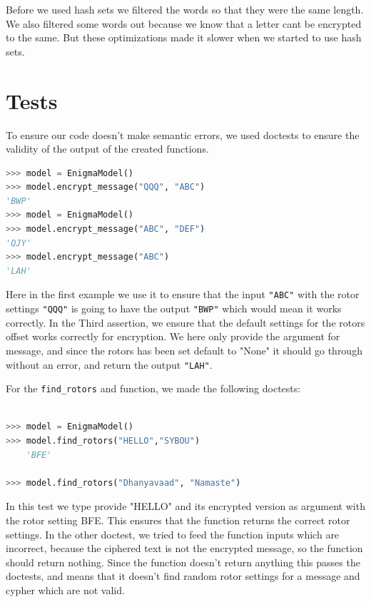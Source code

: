\documentclass{article}
\begin{document}
Before we used hash sets we filtered the words so that they were the same length. We also filtered some words out because we know that a letter cant be encrypted to the same. But these optimizations made it slower when we started to use hash sets.

\section{Tests}
To ensure our code doesn't make semantic errors, we used doctests to ensure the validity of the output of the created functions. 

    
\begin{lstlisting}[language=Python]
>>> model = EnigmaModel()
>>> model.encrypt_message("QQQ", "ABC")
'BWP'
>>> model = EnigmaModel()
>>> model.encrypt_message("ABC", "DEF")
'QJY'
>>> model.encrypt_message("ABC")
'LAH'

\end{lstlisting}
Here in the first example we use it to ensure that the input \verb|"ABC"| with the rotor settings \verb|"QQQ"| is going to have the output \verb|"BWP"| which would mean it works correctly. In the Third assertion, we ensure that the default settings for the rotors offset works correctly for encryption. We here only provide the argument for message, and since the rotors has been set default to "None" it should go through without an error, and return the output \verb|"LAH"|. 

For the \verb|find_rotors| and function, we made the following doctests:

\begin{lstlisting}[language=Python]

>>> model = EnigmaModel()
>>> model.find_rotors("HELLO","SYBOU")
    'BFE'

>>> model.find_rotors("Dhanyavaad", "Namaste")

\end{lstlisting}

In this test we type provide "HELLO"  and its encrypted version as argument with the rotor setting BFE. This ensures that the function returns the correct rotor settings.  In the other doctest, we tried to feed the function inputs which are incorrect, because the ciphered text is not the encrypted message, so the function should return nothing. Since the function doesn't return anything this passes the doctests, and means that it doesn't find random rotor settings for a message and cypher which are not valid. 
\end{document}
